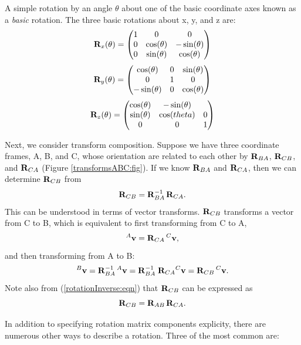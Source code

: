 A simple rotation by an angle $\theta$ about one of the basic
coordinate axes known as a {\it basic} rotation. The three
basic rotations about x, y, and z are:
%
\begin{equation*}
{\bf R}_x(\theta) = \left(\begin{matrix} 1 & 0 & 0 \\ 
               0 & \cos(\theta) & -\sin(\theta) \\ 
               0 & \sin(\theta) & \cos(\theta) 
		 \end{matrix}\right)
\end{equation*}
%
\begin{equation*}
{\bf R}_y(\theta) = \left(\begin{matrix} \cos(\theta) & 0 & \sin(\theta) \\ 
               0 & 1 & 0 \\ 
               -\sin(\theta) & 0 & \cos(\theta) 
                 \end{matrix}\right)
\end{equation*}
%
\begin{equation*}
{\bf R}_z(\theta) = \left(\begin{matrix} \cos(\theta) & -\sin(\theta) & \\ 
               \sin(\theta) & \cos(theta) & 0 \\ 
               0 & 0 & 1 
                 \end{matrix}\right)
\label{elementaryRotations:sec}
\end{equation*}
%

Next, we consider transform composition. Suppose we have three
coordinate frames, A, B, and C, whose orientation are related to each other by
${\bf R}_{BA}$, ${\bf R}_{CB}$, and ${\bf R}_{CA}$ (Figure
\ref{transformsABC:fig}).  If we know ${\bf R}_{BA}$ and ${\bf R}_{CA}$,
then we can determine ${\bf R}_{CB}$ from
%
\begin{equation}
{\bf R}_{CB} = {\bf R}_{BA}^{-1} \, {\bf R}_{CA}.
\label{rotationCB:eqn}
\end{equation}
%
This can be understood in terms of vector transforms. ${\bf R}_{CB}$
transforms a vector from C to B, which is equivalent to first
transforming from C to A,
%
\begin{equation}
{}^A{\bf v} = {\bf R}_{CA} \, {}^C{\bf v},
\end{equation}
%
and then transforming from A to B:
%
\begin{equation}
{}^B{\bf v} = {\bf R}_{BA}^{-1} \, {}^A{\bf v} = {\bf R}_{BA}^{-1} \; {\bf R}_{CA} {}^C{\bf v} = {\bf R}_{CB} \, {}^C{\bf v}.
\end{equation}
%
Note also from (\ref{rotationInverse:eqn}) that ${\bf R}_{CB}$ can be 
expressed as
%
\begin{equation}
{\bf R}_{CB} = {\bf R}_{AB} \, {\bf R}_{CA}.
\label{rotationCBII:eqn}
\end{equation}
%

In addition to specifying rotation matrix components explicity,
there are numerous other ways to describe a rotation.
Three of the most common are:

